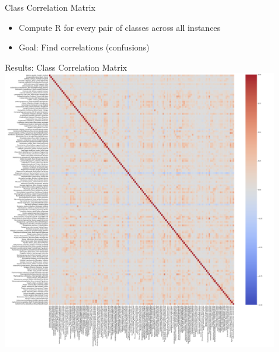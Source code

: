 \begin{frame}{Class Correlation Matrix}
    \begin{itemize}
        \item Compute R for every pair of classes across all instances
        \item Goal: Find correlations (confusions)
    \end{itemize}
\end{frame}

\begin{frame}{Results: Class Correlation Matrix}
    \centering
    \includegraphics[height=0.9\textheight,width=0.9\textwidth,keepaspectratio]{images/no_filter.png}
\end{frame}

